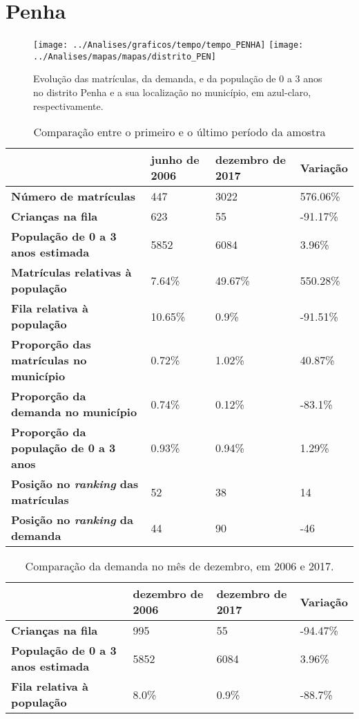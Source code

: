 \section{Penha}
\begin{figure}[H]
\centering
\texttt{[image: ../Analises/graficos/tempo/tempo\_PENHA]}
\texttt{[image: ../Analises/mapas/mapas/distrito\_PEN]}
\caption{Evolução das matrículas, da demanda, e da população de 0 a 3 anos no distrito Penha e a sua localização no município, em azul-claro, respectivamente.}
\end{figure}
\begin{table}[H]
\begin{tabular}{l|l|l|l}
\textbf{}                                      & \textbf{junho de 2006}       & \textbf{dezembro de 2017}    & \textbf{Variação} \\ \hline
\textbf{Número de matrículas}                  & 447 & 3022 & 576.06\% \\ \hline
\textbf{Crianças na fila}                      & 623 & 55 & -91.17\% \\ \hline
\textbf{População de 0 a 3 anos estimada}      & 5852 & 6084 & 3.96\% \\ \hline
\textbf{Matrículas relativas à população}      & 7.64\% & 49.67\% & 550.28\% \\ \hline
\textbf{Fila relativa à população}             & 10.65\% & 0.9\% & -91.51\% \\ \hline
\textbf{Proporção das matrículas no município} & 0.72\% & 1.02\% & 40.87\% \\ \hline
\textbf{Proporção da demanda no município}     & 0.74\% & 0.12\% & -83.1\% \\ \hline
\textbf{Proporção da população de 0 a 3 anos}  & 0.93\% & 0.94\% & 1.29\% \\ \hline
\textbf{Posição no \textit{ranking} das matrículas}     & 52 & 38 & 14 \\ \hline
\textbf{Posição no \textit{ranking} da demanda}         & 44 & 90 & -46 \\ 
\end{tabular}
\caption{Comparação entre o primeiro e o último período da amostra}
\end{table}
\begin{table}[H]
\begin{tabular}{l|l|l|l}
\textbf{}                                 & \textbf{dezembro de 2006} & \textbf{dezembro de 2017} & \textbf{Variação} \\ \hline
\textbf{Crianças na fila}                      & 995 & 55 & -94.47\% \\ \hline
\textbf{População de 0 a 3 anos estimada}      & 5852 & 6084 & 3.96\% \\ \hline
\textbf{Fila relativa à população}             & 8.0\% & 0.9\% & -88.7\% \\
\end{tabular}
\caption{Comparação da demanda no mês de dezembro, em 2006 e 2017.}
\end{table}
